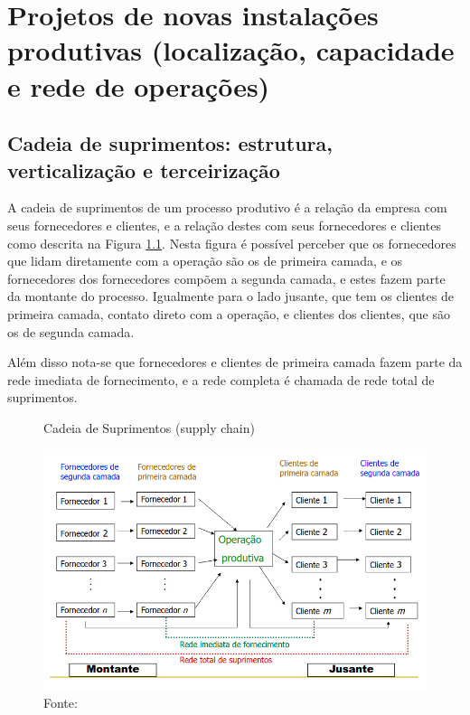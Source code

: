 \chapter{Projetos de novas instalações produtivas (localização, capacidade e rede de operações)} 
\label{chap:projetos_de_novas} 

\section{Cadeia de suprimentos: estrutura, verticalização e terceirização} 
\label{sec:projetos_de_novas_supply_chain} 
A cadeia de suprimentos de um processo produtivo é a relação da empresa com seus fornecedores e clientes, e a relação destes com seus fornecedores e clientes como descrita na Figura \ref{fig:supply_chain}. Nesta figura é possível perceber que os fornecedores que lidam diretamente com a operação são os de primeira camada, e os fornecedores dos fornecedores compõem a segunda camada, e estes fazem parte da montante do processo. Igualmente para o lado jusante, que tem os clientes de primeira camada, contato direto com a operação, e clientes dos clientes, que são os de segunda camada.
\par Além disso nota-se que fornecedores e clientes de primeira camada fazem parte da rede imediata de fornecimento, e a rede completa é chamada de rede total de suprimentos.


\begin{figure}[H]
    \centering
    \caption{Cadeia de Suprimentos (supply chain)}
    \includegraphics[width =\textwidth]{images/supply_chain.png}
    \caption*{Fonte: \cite{supplychain}}
    \label{fig:supply_chain}
\end{figure}
  
